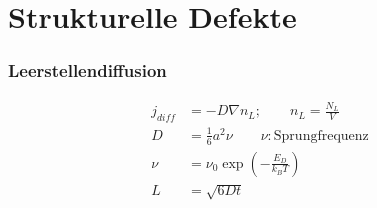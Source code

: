 \section{Strukturelle Defekte}


\subsubsection*{Leerstellendiffusion}

\begin{equation*}
    \begin{aligned}
        j_{diff} &= - D \nabla n_L ; \qquad n_L = \frac{N_L}{V} \\
        D &= \frac{1}{6} a^2 \nu \qquad \nu: \text{Sprungfrequenz} \\
        \nu &= \nu_0 \exp \left(- \frac{E_D}{k_B T}\right) \\
        L &= \sqrt{6Dt}
    \end{aligned}
\end{equation*}